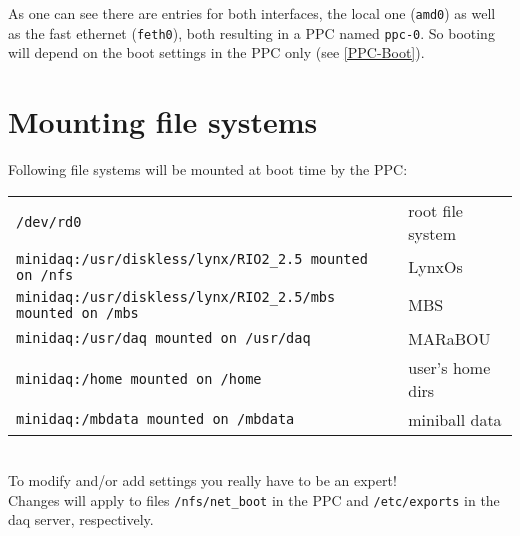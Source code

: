 \documentclass[10pt]{article}
\begin{document}
As one can see there are entries for both interfaces, the local one (\texttt{amd0}) as well as
the fast ethernet (\texttt{feth0}), both resulting in a PPC named \texttt{ppc-0}. So booting
will depend on the boot settings in the PPC only (see \ref{PPC-Boot}).
\newpage
\section{Mounting file systems}
Following file systems will be mounted at boot time by the PPC:\\

\begin{tabular}{ll}
\verb+/dev/rd0+ & root file system \\
\verb+minidaq:/usr/diskless/lynx/RIO2_2.5 mounted on /nfs+ & LynxOs\\
\verb+minidaq:/usr/diskless/lynx/RIO2_2.5/mbs mounted on /mbs+ & MBS\\
\verb+minidaq:/usr/daq mounted on /usr/daq+ & MARaBOU\\
\verb+minidaq:/home mounted on /home+ & user's home dirs\\
\verb+minidaq:/mbdata mounted on /mbdata+ & miniball data\\
\end{tabular}\\

To modify and/or add settings you really have to be an expert!\\
Changes will apply to files
\verb+/nfs/net_boot+ in the PPC and \verb+/etc/exports+ in the daq server, respectively.
\end{document}
